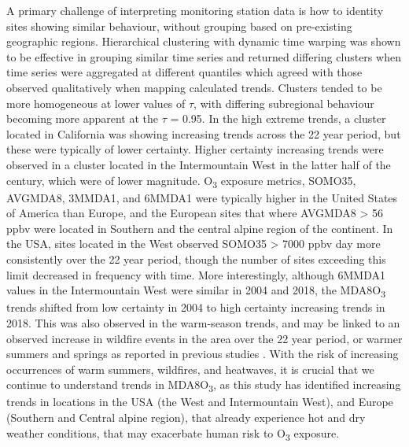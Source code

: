 \documentclass[journal abbreviation, manuscript]{copernicus}
\begin{document}
A primary challenge of interpreting monitoring station data is how to identity sites showing similar behaviour, without grouping based on pre-existing geographic regions. Hierarchical clustering with dynamic time warping was shown to be effective in grouping similar time series and returned differing clusters when time series were aggregated at different quantiles which agreed with those observed qualitatively when mapping calculated trends. Clusters tended to be more homogeneous at lower values of $\tau$, with differing subregional behaviour becoming more apparent at the $\tau$ = 0.95. In the high extreme trends, a cluster located in California was showing increasing trends across the 22 year period, but these were typically of lower certainty. Higher certainty increasing trends were observed in a cluster located in the Intermountain West in the latter half of the century, which were of lower magnitude. O\textsubscript{3} exposure metrics, SOMO35, AVGMDA8, 3MMDA1, and 6MMDA1 were typically higher in the United States of America than Europe, and the European sites that where AVGMDA8 > 56 ppbv were located in Southern and the central alpine region of the continent. In the USA, sites located in the West observed SOMO35 > 7000 ppbv day more consistently over the 22 year period, though the number of sites exceeding this limit decreased in frequency with time. More interestingly, although 6MMDA1 values in the Intermountain West were similar in 2004 and 2018, the MDA8O\textsubscript{3} trends shifted from low certainty in 2004 to high certainty increasing trends in 2018. This was also observed in the warm-season trends, and may be linked to an observed increase in wildfire events in the area over the 22 year period, or warmer summers and springs as reported in previous studies \citep{Lin2017, Li2021, Peterson2021, Iglesias2022}. With the risk of increasing occurrences of warm summers, wildfires, and heatwaves, it is crucial that we continue to understand trends in MDA8O\textsubscript{3}, as this study has identified increasing trends in locations in the USA (the West and Intermountain West), and Europe (Southern and Central alpine region), that already experience hot and dry weather conditions, that may exacerbate human risk to O\textsubscript{3} exposure.

\clearpage

\end{document}
